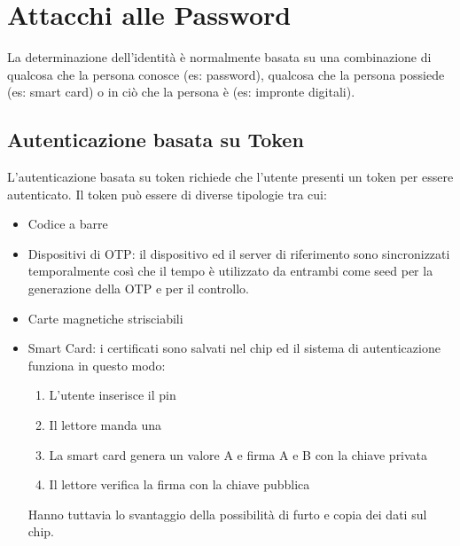 \section{Attacchi alle Password}
\label{sec:passwordattacks}
La determinazione dell'identità è normalmente basata su una combinazione di qualcosa che la persona conosce (es: password), qualcosa che la persona possiede (es: smart card) o in ciò che la persona è (es: impronte digitali).


\subsection{Autenticazione basata su Token}
L'autenticazione basata su token richiede che l'utente presenti un token per essere autenticato.
Il token può essere di diverse tipologie tra cui:
\begin{itemize}[noitemsep]
    \item Codice a barre
    \item Dispositivi di \acrfull{OTP}: il dispositivo ed il server di riferimento sono sincronizzati temporalmente così che il tempo è utilizzato da entrambi come seed per la generazione della \acrshort{OTP} e per il controllo.
    \item Carte magnetiche strisciabili
    \item Smart Card: i certificati sono salvati nel chip ed il sistema di autenticazione funziona in questo modo:
    \begin{enumerate}[noitemsep]
        \item L'utente inserisce il pin
        \item Il lettore manda una 
        \item La smart card genera un valore A e firma A e B con la chiave privata
        \item Il lettore verifica la firma con la chiave pubblica
    \end{enumerate}
    Hanno tuttavia lo svantaggio della possibilità di furto e copia dei dati sul chip.
\end{itemize}


